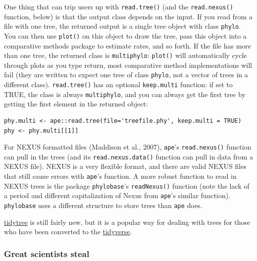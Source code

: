\documentclass[
]{article}
\begin{document}
One thing that can trip users up with \texttt{read.tree()} (and the \texttt{read.nexus()} function, below) is that the output class depends on the input. If you read from a file with one tree, the returned output is a single tree object with class \texttt{phylo}. You can then use \texttt{plot()} on this object to draw the tree, pass this object into a comparative methods package to estimate rates, and so forth. If the file has more than one tree, the returned class is \texttt{multiphylo}: \texttt{plot()} will automatically cycle through plots as you type return, most comparative method implementations will fail (they are written to expect one tree of class \texttt{phylo}, not a vector of trees in a different class). \texttt{read.tree()} has an optional \texttt{keep.multi} function: if set to TRUE, the class is always \texttt{multiphylo}, and you can always get the first tree by getting the first element in the returned object:

\begin{verbatim}
phy.multi <- ape::read.tree(file='treefile.phy', keep.multi = TRUE)
phy <- phy.multi[[1]]
\end{verbatim}

For NEXUS formatted files (Maddison et al., 2007), \texttt{ape}'s \texttt{read.nexus()} function can pull in the trees (and its \texttt{read.nexus.data()} function can pull in data from a NEXUS file). NEXUS is a very flexible format, and there are valid NEXUS files that still cause errors with \texttt{ape}'s function. A more robust function to read in NEXUS trees is the package \texttt{phylobase}'s \texttt{readNexus()} function (note the lack of a period and different capitalization of Nexus from \texttt{ape}'s similar function). \texttt{phylobase} uses a different structure to store trees than \texttt{ape} does.

\href{https://github.com/YuLab-SMU/tidytree}{tidytree} is still fairly new, but it is a popular way for dealing with trees for those who have been converted to the \href{https://www.tidyverse.org/}{tidyverse}.

\hypertarget{great-scientists-steal}{%
\subsubsection{Great scientists steal}\label{great-scientists-steal}}
\end{document}

